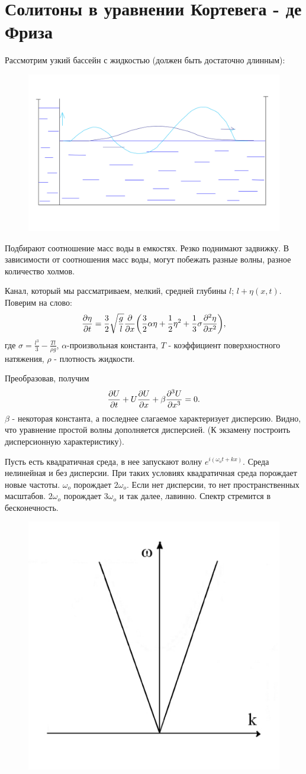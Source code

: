\section{Солитоны в уравнении Кортевега - де Фриза} 
Рассмотрим узкий бассейн с жидкостью (должен быть достаточно длинным):
\begin{figure}[H]
	\centering
	\includegraphics[width=0.4\linewidth]{fig/fig18.pdf}   
\end{figure}

Подбирают соотношение масс воды в емкостях. Резко поднимают задвижку. В зависимости от соотношения масс воды, могут побежать разные волны, разное количество холмов. 

Канал, который мы рассматриваем, мелкий, средней глубины $l$; $l+\eta(x,t)$. Поверим на слово: 
\begin{equation*}
	\pdv{\eta}{t}=\frac32 \sqrt{\frac{g}{l}}\pdv{}{x}\qty(\frac32 \alpha \eta+\frac12 \eta^2+\frac13 \sigma \pdv[2]{\eta}{x}),
\end{equation*}
где $\sigma=\frac{l^3}{3}-\frac{Tl}{\rho g}$, $\alpha$-произвольная константа, $T$ - коэффициент поверхностного натяжения, $\rho$ - плотность жидкости.

Преобразовав, получим
\begin{equation}
	\pdv{U}{t}+U\pdv{U}{x}+\beta \pdv[3]{U}{x}=0.
	\label{eq:33}
\end{equation}
$\beta$ - некоторая константа, а последнее слагаемое характеризует дисперсию. Видно, что уравнение простой волны дополняется дисперсией. (К экзамену построить дисперсионную характеристику). 

Пусть есть квадратичная среда, в нее запускают волну $e^{i(\omega_o t+kx)}$. Среда нелинейная и без дисперсии. При таких условиях квадратичная среда порождает новые частоты. $\omega_o$ порождает $2\omega_o$. Если нет дисперсии, то нет пространственных масштабов. $2\omega_o$ порождает $3\omega_o$ и так далее, лавинно. Спектр стремится в бесконечность. 
\begin{figure}[H]
	\centering
	\includegraphics[width=0.4\linewidth]{fig/fig4.pdf}   
\end{figure}

